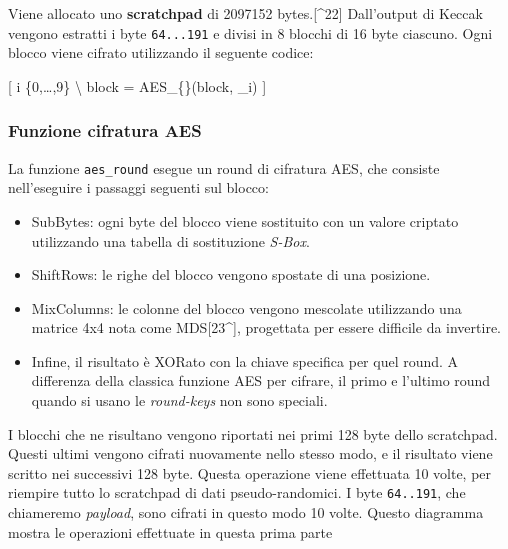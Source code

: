 Viene allocato uno \textbf{scratchpad} di 2097152 bytes.{[}\^{}22{]}
Dall'output di Keccak vengono estratti i byte \texttt{64...191} e divisi
in 8 blocchi di 16 byte ciascuno. Ogni blocco viene cifrato utilizzando
il seguente codice:

{[}  i \in \{0,\ldots,9\} \Rightarrow \textbackslash{}
\quad block = AES\_\{\}(block, \_i) {]}

\subsubsection{Funzione cifratura AES}\label{funzione-cifratura-aes}

La funzione \texttt{aes\_round} esegue un round di cifratura AES, che
consiste nell'eseguire i passaggi seguenti sul blocco:

\begin{itemize}
\tightlist
\item
  SubBytes: ogni byte del blocco viene sostituito con un valore criptato
  utilizzando una tabella di sostituzione \emph{S-Box}.
\item
  ShiftRows: le righe del blocco vengono spostate di una posizione.
\item
  MixColumns: le colonne del blocco vengono mescolate utilizzando una
  matrice 4x4 nota come MDS{[}23\^{}{]}, progettata per essere difficile
  da invertire.
\item
  Infine, il risultato è XORato con la chiave specifica per quel round.
  A differenza della classica funzione AES per cifrare, il primo e
  l'ultimo round quando si usano le \emph{round-keys} non sono speciali.
\end{itemize}

I blocchi che ne risultano vengono riportati nei primi 128 byte dello
scratchpad. Questi ultimi vengono cifrati nuovamente nello stesso modo,
e il risultato viene scritto nei successivi 128 byte. Questa operazione
viene effettuata 10 volte, per riempire tutto lo scratchpad di dati
pseudo-randomici. I byte \texttt{64..191}, che chiameremo
\emph{payload}, sono cifrati in questo modo 10 volte. Questo diagramma
mostra le operazioni effettuate in questa prima parte

